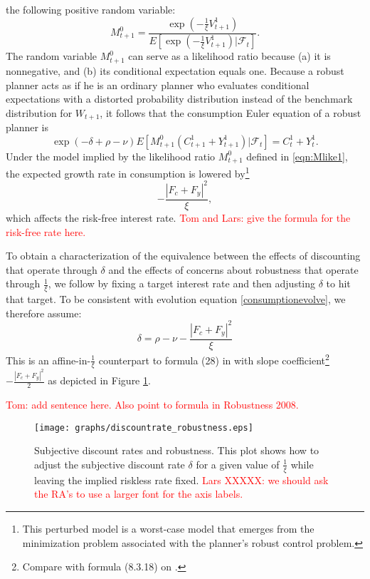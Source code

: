 \documentclass[12pt]{article}
\begin{document}
 the following positive random variable: %
\begin{equation}\label{eqn:Mlike1}
M_{t+1}^0 = {\frac {\exp \left( - {\frac 1 \xi} V_{t+1}^1 \right)}{E\left[ \exp \left( - {\frac 1 \xi} V_{t+1}^1 \right) \vert {\mathcal F}_t \right]}}.
\end{equation}
The random variable $M_{t+1}^0$ can serve  as  a likelihood ratio because (a) it is nonnegative, and (b) its conditional expectation equals one.
Because a robust planner acts as if he is an  ordinary planner who   evaluates conditional expectations with a distorted probability distribution instead of the benchmark distribution for $W_{t+1}$, it follows that the consumption Euler equation of  a robust planner  is
\[
\exp( -\delta + \rho - \nu) E\left[M_{t+1}^0 \left(C_{t+1}^1 + Y_{t+1}^1\right) \vert {\mathcal F}_t \right] = C_t^1 + Y_t^1 .
\]
Under the  model implied by  the likelihood ratio  $M_{t+1}^0$ defined in \eqref{eqn:Mlike1}, the expected growth rate in consumption is
 lowered by\footnote{This perturbed model is a  worst-case model that emerges from the minimization problem associated with the planner's
 robust control problem.} 
\[
- {\frac {|F_c + F_y|^2} {\xi }},
\]
which affects  the risk-free interest rate.
\textcolor{red}{Tom and Lars: give the formula for the risk-free rate here.}

To obtain a characterization of the equivalence between the effects of discounting that operate through $\delta$ and the effects of concerns about
 robustness that operate through $\frac{1}{\xi}$,
we follow \cite{hst:1999} by fixing a target interest rate and  then adjusting $\delta$ to hit that target.
To be consistent with  evolution equation \eqref{consumptionevolve}, we therefore assume:
\[
\delta = \rho - \nu - {\frac {|F_c + F_y|^2} {\xi }}
\]
This is an affine-in-${\frac 1 \xi}$  counterpart to formula (28) in  \cite{hst:1999} with slope coefficient\footnote{Compare with formula  (8.3.18) on \citet[p.~231]{HansenSargent_Recursive_Models}.}
$
- {\frac {|F_c + F_y|^2} {2 }} $ as  depicted in Figure \ref{fig:discountrate}.


\textcolor{red}{Tom: add sentence here. Also point to formula in Robustness 2008.}


\begin{figure}[H]
\texttt{[image: graphs/discountrate\_robustness.eps]}
\caption{Subjective discount rates and robustness. This plot shows how to adjust the subjective discount rate
$\delta$ for a given value of ${\frac 1 \xi}$ while leaving the implied riskless rate fixed. \textcolor{red}{Lars XXXXX: we should
ask the RA's to use a larger font for the axis labels.}\label{fig:discountrate}}
\end{figure}
\end{document}
